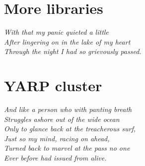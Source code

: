 \documentclass[a4paper]{report}
\begin{document}
\newpage

\addtolength{\hoffset}{-1cm}



%

%

%

\newpage
\chapter{More libraries}
\begin{flushright}
\textit{
					With that my panic quieted a little \\
          After lingering on in the lake of my heart \\
          Through the night I had so grievously passed. \\ 
       }
\end{flushright}
\addtolength{\hoffset}{1cm}

\newpage

\addtolength{\hoffset}{-1cm}


\newpage
\chapter{YARP cluster}
\begin{flushright}
\textit{
				  And like a person who with panting breath \\
          Struggles ashore out of the wide ocean \\
          Only to glance back at the treacherous surf, \\ 
          Just so my mind, racing on ahead, \\ 
          Turned back to marvel at the pass no one \\ 
          Ever before had issued from alive. \\
       }
\end{flushright}
\addtolength{\hoffset}{1cm}

\newpage

\addtolength{\hoffset}{-1cm}

\end{document}
